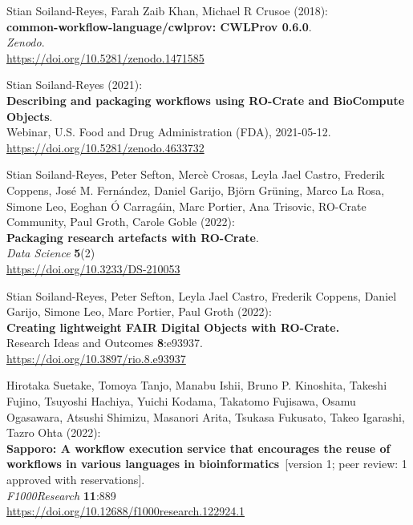 \documentclass[10pt,letterpaper]{article}
\begin{document}
\begin{thebibliography}{10}
\begin{small}
Stian Soiland-Reyes, Farah Zaib Khan, Michael R Crusoe (2018):\\
\textbf{common-workflow-language/cwlprov: CWLProv 0.6.0}.\\
\emph{Zenodo}.\\
\url{https://doi.org/10.5281/zenodo.1471585}

Stian Soiland-Reyes (2021):\\
\textbf{Describing and packaging workflows using RO-Crate and BioCompute Objects}.\\
Webinar, U.S. Food and Drug Administration (FDA), 2021-05-12.\\
\url{https://doi.org/10.5281/zenodo.4633732}


Stian Soiland-Reyes, Peter Sefton, Mercè
Crosas, Leyla Jael Castro, Frederik Coppens, José M. Fernández, Daniel
Garijo, Björn Grüning, Marco La Rosa, Simone Leo, Eoghan Ó Carragáin,
Marc Portier, Ana Trisovic, RO-Crate Community, Paul Groth, Carole Goble
(2022):\\
\textbf{Packaging research artefacts with RO-Crate}.\\
\emph{Data Science} \textbf{5}(2)\\
\url{https://doi.org/10.3233/DS-210053}


 Stian Soiland-Reyes, Peter Sefton, Leyla Jael
Castro, Frederik Coppens, Daniel Garijo, Simone Leo, Marc Portier, Paul
Groth (2022):\\
\textbf{Creating lightweight FAIR Digital Objects with RO-Crate.}\\
Research Ideas and Outcomes \textbf{8}:e93937.\\
\url{https://doi.org/10.3897/rio.8.e93937}


 Hirotaka Suetake, Tomoya Tanjo, Manabu Ishii, Bruno
P. Kinoshita, Takeshi Fujino, Tsuyoshi Hachiya, Yuichi Kodama, Takatomo
Fujisawa, Osamu Ogasawara, Atsushi Shimizu, Masanori Arita, Tsukasa
Fukusato, Takeo Igarashi, Tazro Ohta (2022):\\
\textbf{Sapporo: A workflow execution service that encourages the reuse
of workflows in various languages in bioinformatics}~[version 1; peer review: 1 approved with reservations].\\
\emph{F1000Research} \textbf{11}:889\\
\url{https://doi.org/10.12688/f1000research.122924.1}


\end{small}
\end{thebibliography}
\end{document}
